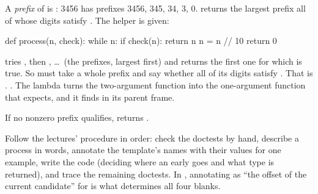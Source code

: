 \documentclass[10pt]{scrartcl}
\begin{document}
\begin{example*}
A \emph{prefix} of  is : 3456 has prefixes 3456, 345, 34, 3, 0.  returns the largest prefix all of whose digits satisfy . The helper  is given:
\begin{py}
def process(n, check):
    while n:
        if check(n):
            return n
        n = n // 10
    return 0
\end{py}
\begin{steps}
  \ii {} tries , then , \dots\ (the prefixes, largest first) and returns the first one for which  is true.
  \ii So  must take a whole prefix  and say whether all of its digits satisfy . That is .
  \ii {}. The lambda turns the two-argument function  into the one-argument function that  expects, and it finds  in its parent frame.
\end{steps}
If no nonzero prefix qualifies,  returns .
\end{example*}
\revisit Follow the lectures' procedure in order: check the doctests by hand, describe a process in words, annotate the template's names with their values for one example, write the code (deciding where an early  goes and what type is returned), and trace the remaining doctests. In , annotating  as ``the offset of the current candidate'' for  is what determines all four blanks.
\end{document}
